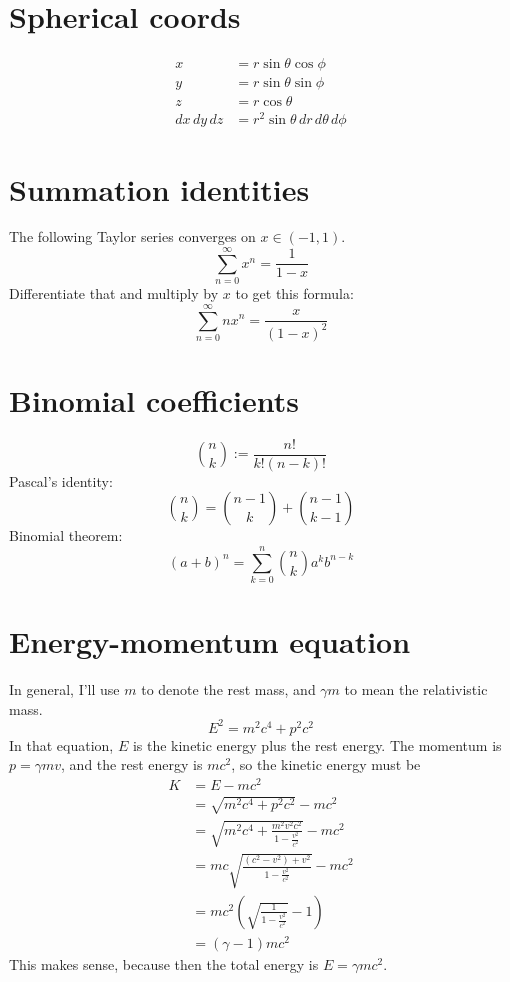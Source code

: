 \documentclass[12pt]{article}
\begin{document}
\section{Spherical coords}
\begin{align*}
    x &= r \sin \theta \cos \phi \\
    y &= r \sin \theta \sin \phi \\
    z &= r \cos \theta \\
    dx \, dy \, dz &= r^2 \sin \theta \, dr \, d\theta \, d\phi
\end{align*}

\section{Summation identities}
The following Taylor series converges on $x \in (-1, 1)$.
\[\sum_{n=0}^\infty x^n = \frac{1}{1-x} \]
Differentiate that and multiply by $x$ to get this formula:
\[\sum_{n=0}^\infty nx^n = \frac{x}{(1-x)^2} \]

\section{Binomial coefficients}
\[ \binom{n}{k} := \frac{n!}{k! (n-k)!} \]
Pascal's identity:
\[\binom{n}{k} = \binom{n-1}{k} + \binom{n-1}{k-1}\]
Binomial theorem:
\[(a+b)^n = \sum_{k=0}^n \binom{n}{k} a^k b^{n-k}\]

\section{Energy-momentum equation}
In general, I'll use $m$ to denote the rest mass, and $\gamma m$ to mean the relativistic mass.
\[E^2 = m^2 c^4 + p^2 c^2\]
In that equation, $E$ is the kinetic energy plus the rest energy. The momentum is $p = \gamma m v$, and the rest energy is $mc^2$, so the kinetic energy must be
\begin{align*}
    K &= E - mc^2 \\
      &= \sqrt{m^2 c^4 + p^2 c^2} - mc^2 \\
      &= \sqrt{m^2 c^4 + \frac{m^2 v^2 c^2}{1 - \frac{v^2}{c^2}}} - mc^2 \\
      &= m c \sqrt{\frac{(c^2 - v^2) + v^2}{1 - \frac{v^2}{c^2}}} - mc^2 \\
      &= m c^2 \left( \sqrt{\frac{1}{1 - \frac{v^2}{c^2}}} - 1 \right) \\
      &= (\gamma - 1) m c^2
\end{align*}
This makes sense, because then the total energy is $E = \gamma m c^2$.
\end{document}
